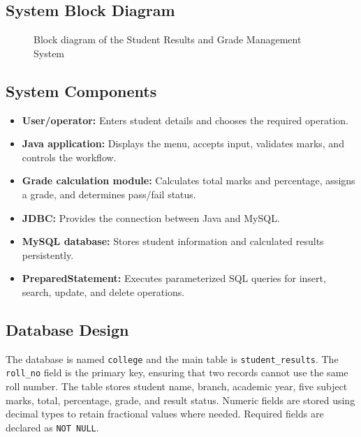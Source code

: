 \documentclass[11pt,a4paper]{report}
\begin{document}
\subsection{System Block Diagram}
\begin{figure}[ht]
\centering
{}
\caption{Block diagram of the Student Results and Grade Management System}
\label{fig:blockdiagram}
\end{figure}

\subsection{System Components}
\begin{itemize}
\item \textbf{User/operator:} Enters student details and chooses the required operation.
\item \textbf{Java application:} Displays the menu, accepts input, validates marks, and controls the workflow.
\item \textbf{Grade calculation module:} Calculates total marks and percentage, assigns a grade, and determines pass/fail status.
\item \textbf{JDBC:} Provides the connection between Java and MySQL.
\item \textbf{MySQL database:} Stores student information and calculated results persistently.
\item \textbf{PreparedStatement:} Executes parameterized SQL queries for insert, search, update, and delete operations.
\end{itemize}

\subsection{Database Design}
The database is named \texttt{college} and the main table is \texttt{student\_results}. The \texttt{roll\_no} field is the primary key, ensuring that two records cannot use the same roll number. The table stores student name, branch, academic year, five subject marks, total, percentage, grade, and result status. Numeric fields are stored using decimal types to retain fractional values where needed. Required fields are declared as \texttt{NOT NULL}.
\end{document}
